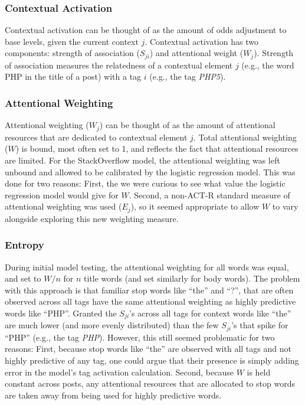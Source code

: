 \documentclass[10pt,letterpaper]{article}
\begin{document}
\subsubsection{Contextual Activation}

Contextual activation can be thought of as the amount of odds adjustment to base levels, given the current context $j$.
Contextual activation has two components: strength of association ($S_{ji}$) and attentional weight ($W_{j}$).
Strength of association measures the relatedness of a contextual element $j$ (e.g., the word PHP in the title of a post) with a tag $i$ (e.g., the tag \emph{PHP5}).

\subsubsection{Attentional Weighting}

Attentional weighting ($W_{j}$) can be thought of as the amount of attentional resources that are dedicated to contextual element $j$.
Total attentional weighting ($W$) is bound, most often set to 1, and reflects the fact that attentional resources are limited.
For the StackOverflow model, the attentional weighting was left unbound and allowed to be calibrated by the logistic regression model.
This was done for two reasons:
First, the we were curious to see what value the logistic regression model would give for $W$.
Second, a non-ACT-R standard measure of attentional weighting was used ($E_{j}$), so it seemed appropriate to allow $W$ to vary alongside exploring this new weighting measure.

\subsubsection{Entropy}

During initial model testing, the attentional weighting for all words was equal, and set to $W/n$ for $n$ title words (and set similarly for body words).
The problem with this approach is that familiar stop words like ``the'' and ``?'', that are often observed across all tags have the same attentional weighting as highly predictive words like ``PHP''.
Granted the $S_{ji}$'s across all tags for context words like ``the'' are much lower (and more evenly distributed) than the few $S_{ji}$'s that spike for ``PHP'' (e.g., the tag \emph{PHP}).
However, this still seemed problematic for two reasons:
First, because stop words like ``the'' are observed with all tags and not highly predictive of any tag, one could argue that their presence is simply adding error in the model's tag activation calculation.
Second, because $W$ is held constant across posts, any attentional resources that are allocated to stop words are taken away from being used for highly predictive words.
\end{document}
